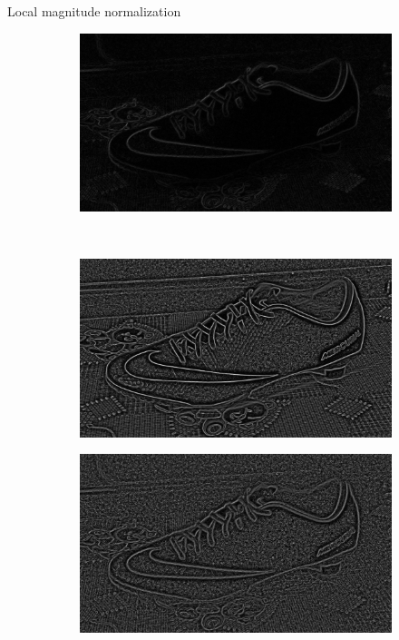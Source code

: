 \documentclass[14pt,t]{beamer}
\begin{document}
\begin{frame}{Local magnitude normalization}
\begin{figure}[p]
\begin{subfigure}[t]{0.4\textwidth}
	\end{subfigure}
	\begin{subfigure}[t]{0.4\textwidth}
		\includegraphics[width=\textwidth]{img/pixelNormalizationExample4.png}
	\end{subfigure}\\
	\vspace{0.75mm}
	\begin{subfigure}[t]{0.4\textwidth}
		\includegraphics[width=\textwidth]{img/pixelNormalizationExample5.png}
	\end{subfigure}
	\begin{subfigure}[t]{0.4\textwidth}
		\includegraphics[width=\textwidth]{img/pixelNormalizationExample6.png}
	\end{subfigure}
\end{figure}
\end{frame}
\end{document}
